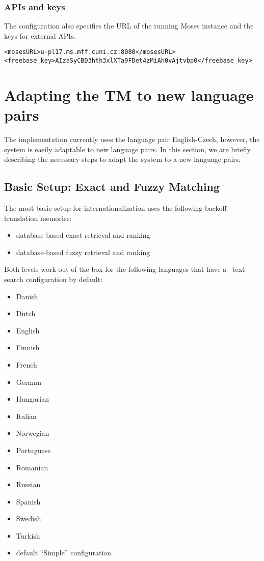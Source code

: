 \subsubsection{APIs and keys}

The configuration also specifies the URL of the running Moses instance and the keys for external APIs.

\begin{lstlisting}
<mosesURL>u-pl17.ms.mff.cuni.cz:8080</mosesURL>
<freebase_key>AIzaSyCBD3hth3xlXTa9FDet4zMiAh0vAjtvbp0</freebase_key>
\end{lstlisting}


\section{Adapting the TM to new language pairs}
\label{sec:internationalization}

The implementation currently uses the language pair English-Czech, however, the system is easily adaptable to new language pairs. In this section, we are briefly describing the necessary steps to adapt the system to a new language pairs.

\subsection{Basic Setup: Exact and Fuzzy Matching}

The most basic setup for internationalization uses the following backoff translation memories:

\begin{itemize}
	\item database-based exact retrieval and ranking
	\item database-based fuzzy retrieval and ranking
\end{itemize}

Both levels work out of the box for the following languages that have a \postgres~text search configuration by default:

\begin{itemize}
	\item Danish
	\item Dutch
	\item English
	\item Finnish
	\item French
	\item German
	\item Hungarian
	\item Italian
	\item Norwegian
	\item Portuguese
	\item Romanian
	\item Russian
	\item Spanish
	\item Swedish
	\item Turkish
	\item default “Simple” configuration
\end{itemize}

